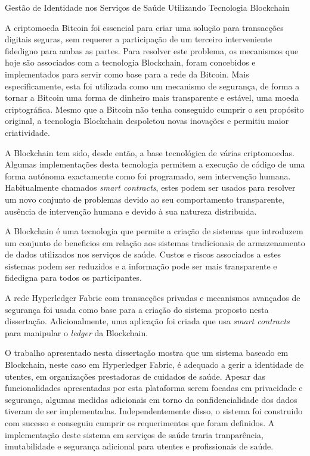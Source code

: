 \begin{tueSUMARIO}
  {\Large Gestão de Identidade nos Serviços de Saúde Utilizando Tecnologia
  Blockchain}
	\bigskip

  A criptomoeda Bitcoin foi essencial para criar uma solução para transacções
  digitais seguras, sem requerer a participação de um terceiro interveniente
  fidedigno para ambas as partes.  Para resolver este problema, os mecanismos
  que hoje são associados com a tecnologia Blockchain, foram concebidos e
  implementados para servir como base para a rede da Bitcoin. Mais
  especificamente, esta foi utilizada como um mecanismo de segurança, de forma
  a tornar a Bitcoin uma forma de dinheiro mais transparente e estável, uma
  moeda criptográfica. Mesmo que a Bitcoin não tenha conseguido cumprir o seu
  propósito original, a tecnologia Blockchain despoletou novas inovações e
  permitiu maior criatividade.

  A Blockchain tem sido, desde então, a base tecnológica de várias
  criptomoedas. Algumas implementações desta tecnologia permitem a execução de
  código de uma forma autónoma exactamente como foi programado, sem intervenção
  humana.  Habitualmente chamados \textit{smart contracts}, estes podem ser
  usados para resolver um novo conjunto de problemas devido ao seu
  comportamento transparente, ausência de intervenção humana e devido à sua
  natureza distribuida. 

  A Blockchain é uma tecnologia que permite a criação de sistemas que
  introduzem um conjunto de beneficios em relação aos sistemas tradicionais de
  armazenamento de dados utilizados nos serviços de saúde. Custos e riscos
  associados a estes sistemas podem ser reduzidos e a informação pode ser mais
  transparente e fidedigna para todos os participantes.

  A rede Hyperledger Fabric com transacções privadas e mecanismos avançados de
  segurança foi usada como base para a criação do sistema proposto nesta
  dissertação. Adicionalmente, uma aplicação foi criada que usa \textit{smart
  contracts} para manipular o \textit{ledger} da Blockchain.

  O trabalho apresentado nesta dissertação mostra que um sistema baseado em
  Blockchain, neste caso em Hyperledger Fabric, é adequado a gerir a identidade
  de utentes,  em organizações prestadoras de cuidados de saúde. Apesar das
  funcionalidades apresentadas por esta plataforma serem focadas em privacidade
  e segurança, algumas medidas adicionais em torno da confidencialidade dos
  dados tiveram de ser implementadas. Independentemente disso, o sistema foi
  construido com sucesso e conseguiu cumprir os requerimentos que foram
  definidos. A implementação deste sistema em serviços de saúde traria
  tranparência, imutabilidade e segurança adicional para utentes e
  profissionais de saúde.

\end{tueSUMARIO}
